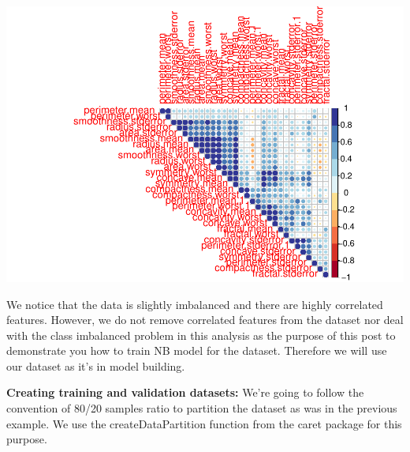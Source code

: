 \documentclass[]{article}
\newenvironment{Shaded}{\begin{snugshade}}{\end{snugshade}}
\newcommand{\CommentTok}[1]{\textcolor[rgb]{0.56,0.35,0.01}{\textit{#1}}}
\newcommand{\DataTypeTok}[1]{\textcolor[rgb]{0.13,0.29,0.53}{#1}}
\newcommand{\DecValTok}[1]{\textcolor[rgb]{0.00,0.00,0.81}{#1}}
\newcommand{\FloatTok}[1]{\textcolor[rgb]{0.00,0.00,0.81}{#1}}
\newcommand{\KeywordTok}[1]{\textcolor[rgb]{0.13,0.29,0.53}{\textbf{#1}}}
\newcommand{\NormalTok}[1]{#1}
\newcommand{\OperatorTok}[1]{\textcolor[rgb]{0.81,0.36,0.00}{\textbf{#1}}}
\newcommand{\OtherTok}[1]{\textcolor[rgb]{0.56,0.35,0.01}{#1}}
\newcommand{\StringTok}[1]{\textcolor[rgb]{0.31,0.60,0.02}{#1}}
\begin{document}
\includegraphics{Breast-cancer_files/figure-latex/unnamed-chunk-1-1.pdf}

We notice that the data is slightly imbalanced and there are highly
correlated features. However, we do not remove correlated features from
the dataset nor deal with the class imbalanced problem in this analysis
as the purpose of this post to demonstrate you how to train NB model for
the dataset. Therefore we will use our dataset as it's in model
building.

\textbf{Creating training and validation datasets:} We're going to
follow the convention of 80/20 samples ratio to partition the dataset as
was in the previous example. We use the createDataPartition function
from the caret package for this purpose.

\begin{Shaded}
\end{Shaded}
\end{document}
